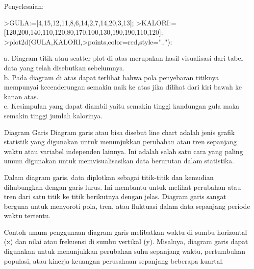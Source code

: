 \documentclass[a4paper,10pt]{article}
\begin{document}
\begin{eulernotebook}
\begin{eulercomment}
\begin{eulercomment}
\begin{eulercomment}
\begin{eulercomment}
\begin{eulercomment}
\begin{eulercomment}
\begin{eulercomment}
\begin{eulercomment}
\begin{eulercomment}
\begin{eulercomment}
\begin{eulercomment}
\begin{eulercomment}
\begin{eulercomment}
\begin{eulercomment}
\begin{eulercomment}
\begin{eulercomment}
\begin{eulercomment}
\begin{eulercomment}
\begin{eulercomment}
Penyelesaian:
\end{eulercomment}
\begin{eulerprompt}
>GULA:=[4,15,12,11,8,6,14,2,7,14,20,3,13];
>KALORI:=[120,200,140,110,120,80,170,100,130,190,190,110,120];
>plot2d(GULA,KALORI,>points,color=red,style=".."):
\end{eulerprompt}
\begin{eulercomment}
a. Diagram titik atau scatter plot di atas merupakan hasil visualisasi
dari tabel data yang telah disebutkan sebelumnya.\\
b. Pada diagram di atas dapat terlihat bahwa pola penyebaran titiknya
mempunyai kecenderungan semakin naik ke atas jika dilihat dari kiri
bawah ke kanan atas.\\
c. Kesimpulan yang dapat diambil yaitu semakin tinggi kandungan gula
maka semakin tinggi jumlah kalorinya.
\end{eulercomment}
\eulersubheading{}
\begin{eulercomment}
Diagram Garis 
Diagram garis atau bisa disebut line chart adalah jenis grafik
statistik yang digunakan untuk menunjukkan perubahan atau tren
sepanjang waktu atau variabel independen lainnya. Ini adalah salah
satu cara yang paling umum digunakan untuk memvisualisasikan data
berurutan dalam statistika.

Dalam diagram garis, data diplotkan sebagai titik-titik dan kemudian
dihubungkan dengan garis lurus. Ini membantu untuk melihat perubahan
atau tren dari satu titik ke titik berikutnya dengan jelas. Diagram
garis sangat berguna untuk menyoroti pola, tren, atau fluktuasi dalam
data sepanjang periode waktu tertentu.

Contoh umum penggunaan diagram garis melibatkan waktu di sumbu
horizontal (x) dan nilai atau frekuensi di sumbu vertikal (y).
Misalnya, diagram garis dapat digunakan untuk menunjukkan perubahan
suhu sepanjang waktu, pertumbuhan populasi, atau kinerja keuangan
perusahaan sepanjang beberapa kuartal.


\end{eulercomment}
\end{eulercomment}
\end{eulercomment}
\end{eulercomment}
\end{eulercomment}
\end{eulercomment}
\end{eulercomment}
\end{eulercomment}
\end{eulercomment}
\end{eulercomment}
\end{eulercomment}
\end{eulercomment}
\end{eulercomment}
\end{eulercomment}
\end{eulercomment}
\end{eulercomment}
\end{eulercomment}
\end{eulercomment}
\end{eulercomment}
\end{eulernotebook}
\end{document}
